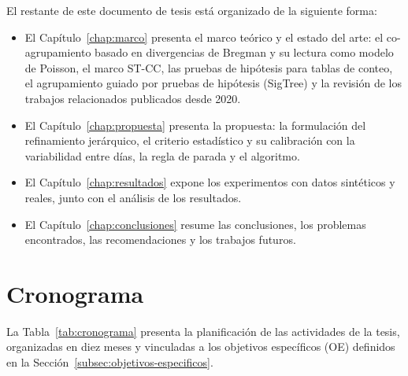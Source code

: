 El restante de este documento de tesis está organizado de la siguiente
forma:

\begin{itemize}
    \item El Capítulo~\ref{chap:marco} presenta el marco teórico y el estado
          del arte: el co-agrupamiento basado en divergencias de Bregman y su
          lectura como modelo de Poisson, el marco \ac{ST-CC}, las pruebas de
          hipótesis para tablas de conteo, el agrupamiento guiado por pruebas
          de hipótesis (SigTree) y la revisión de los trabajos relacionados
          publicados desde 2020.
    \item El Capítulo~\ref{chap:propuesta} presenta la propuesta: la
          formulación del refinamiento jerárquico, el criterio estadístico y
          su calibración con la variabilidad entre días, la regla de parada y
          el algoritmo.
    \item El Capítulo~\ref{chap:resultados} expone los experimentos con
          datos sintéticos y reales, junto con el análisis de los
          resultados.
    \item El Capítulo~\ref{chap:conclusiones} resume las conclusiones, los
          problemas encontrados, las recomendaciones y los trabajos futuros.
\end{itemize}

\section{Cronograma}
\label{sec:cronograma}

La Tabla~\ref{tab:cronograma} presenta la planificación de las actividades
de la tesis, organizadas en diez meses y vinculadas a los objetivos
específicos (OE) definidos en la Sección~\ref{subsec:objetivos-especificos}.

